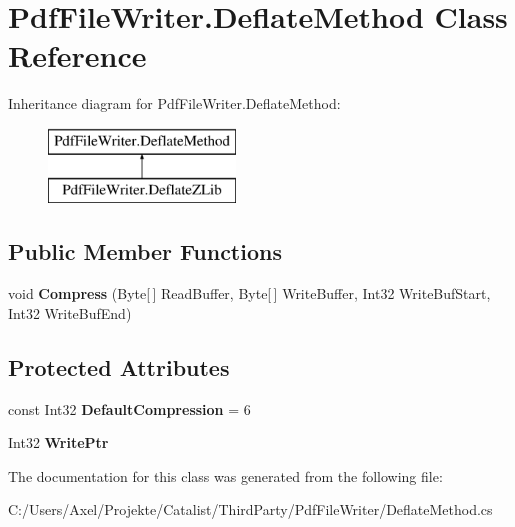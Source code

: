 \hypertarget{class_pdf_file_writer_1_1_deflate_method}{}\section{Pdf\+File\+Writer.\+Deflate\+Method Class Reference}
\label{class_pdf_file_writer_1_1_deflate_method}
Inheritance diagram for Pdf\+File\+Writer.\+Deflate\+Method\+:\begin{figure}[H]
\begin{center}
\leavevmode
\includegraphics[height=2.000000cm]{class_pdf_file_writer_1_1_deflate_method}
\end{center}
\end{figure}
\subsection*{Public Member Functions}
\begin{DoxyCompactItemize}
\item 
void {\bfseries Compress} (Byte\mbox{[}$\,$\mbox{]} Read\+Buffer, Byte\mbox{[}$\,$\mbox{]} Write\+Buffer, Int32 Write\+Buf\+Start, Int32 Write\+Buf\+End)\hypertarget{class_pdf_file_writer_1_1_deflate_method_a4ce2591ef722e7bd9597a6dc2741dbde}{}\label{class_pdf_file_writer_1_1_deflate_method_a4ce2591ef722e7bd9597a6dc2741dbde}

\end{DoxyCompactItemize}
\subsection*{Protected Attributes}
\begin{DoxyCompactItemize}
\item 
const Int32 {\bfseries Default\+Compression} = 6\hypertarget{class_pdf_file_writer_1_1_deflate_method_a0ac744d5aac68f74885555c894e0db34}{}\label{class_pdf_file_writer_1_1_deflate_method_a0ac744d5aac68f74885555c894e0db34}

\item 
Int32 {\bfseries Write\+Ptr}\hypertarget{class_pdf_file_writer_1_1_deflate_method_a8990bb6707168c0d06b0c81a6e0cb21c}{}\label{class_pdf_file_writer_1_1_deflate_method_a8990bb6707168c0d06b0c81a6e0cb21c}

\end{DoxyCompactItemize}


The documentation for this class was generated from the following file\+:\begin{DoxyCompactItemize}
\item 
C\+:/\+Users/\+Axel/\+Projekte/\+Catalist/\+Third\+Party/\+Pdf\+File\+Writer/Deflate\+Method.\+cs\end{DoxyCompactItemize}
